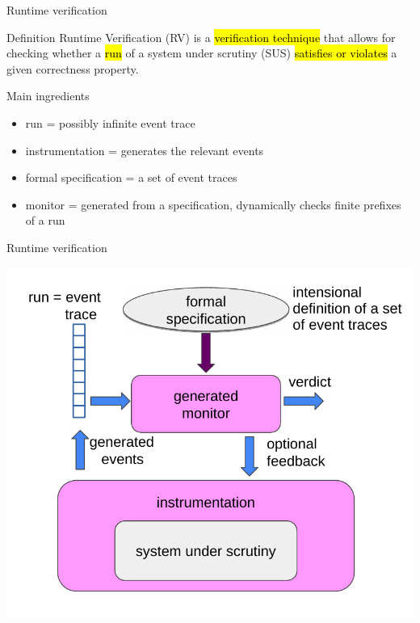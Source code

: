 \documentclass[10pt,usenames,dvipsnames]{beamer}
\begin{document}
\begin{frame}{Runtime verification}

  \begin{block}{Definition}
    Runtime Verification (RV) is a \hl{verification technique} that allows for checking whether a \hl{run} of a system under scrutiny (SUS) \hl{satisfies or violates} a given correctness property.
  \end{block}

  \begin{block}{Main ingredients}
   \begin{itemize}
   \item run = possibly infinite event trace
   \item instrumentation = generates the relevant events
   \item formal specification = a set of event traces     
   \item monitor =  generated from a specification, dynamically checks finite prefixes of a run 
\end{itemize}
  \end{block}

\end{frame}


\begin{frame}{Runtime verification}

  \begin{center}
    \includegraphics[keepaspectratio,height=0.7\textheight]{images/rv}
  \end{center}

\end{frame}
\end{document}
